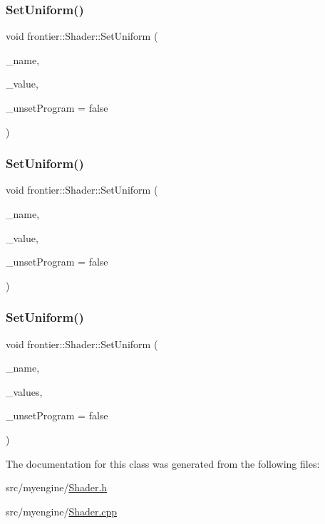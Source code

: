 \subsubsection{\texorpdfstring{Set\+Uniform()}{SetUniform()}\hspace{0.1cm}{\footnotesize\ttfamily [6/8]}}
{\footnotesize\ttfamily void frontier\+::\+Shader\+::\+Set\+Uniform (\begin{DoxyParamCaption}\item[{const G\+Lchar $\ast$}]{\+\_\+name,  }\item[{glm\+::vec3}]{\+\_\+value,  }\item[{bool}]{\+\_\+unset\+Program = {\ttfamily false} }\end{DoxyParamCaption})}

\mbox{\label{classfrontier_1_1_shader_a2f1cc89390360779c0df68f2d10efff1}} 
\subsubsection{\texorpdfstring{Set\+Uniform()}{SetUniform()}\hspace{0.1cm}{\footnotesize\ttfamily [7/8]}}
{\footnotesize\ttfamily void frontier\+::\+Shader\+::\+Set\+Uniform (\begin{DoxyParamCaption}\item[{const G\+Lchar $\ast$}]{\+\_\+name,  }\item[{glm\+::vec4}]{\+\_\+value,  }\item[{bool}]{\+\_\+unset\+Program = {\ttfamily false} }\end{DoxyParamCaption})}

\mbox{\label{classfrontier_1_1_shader_ac2c00404227e37fa33d031b6725d79fb}} 
\subsubsection{\texorpdfstring{Set\+Uniform()}{SetUniform()}\hspace{0.1cm}{\footnotesize\ttfamily [8/8]}}
{\footnotesize\ttfamily void frontier\+::\+Shader\+::\+Set\+Uniform (\begin{DoxyParamCaption}\item[{const G\+Lchar $\ast$}]{\+\_\+name,  }\item[{std\+::vector$<$ std\+::weak\+\_\+ptr$<$ \hyperlink{classfrontier_1_1_texture}{Texture} $>$$>$}]{\+\_\+values,  }\item[{bool}]{\+\_\+unset\+Program = {\ttfamily false} }\end{DoxyParamCaption})}



The documentation for this class was generated from the following files\+:\begin{DoxyCompactItemize}
\item 
src/myengine/\hyperlink{_shader_8h}{Shader.\+h}\item 
src/myengine/\hyperlink{_shader_8cpp}{Shader.\+cpp}\end{DoxyCompactItemize}
